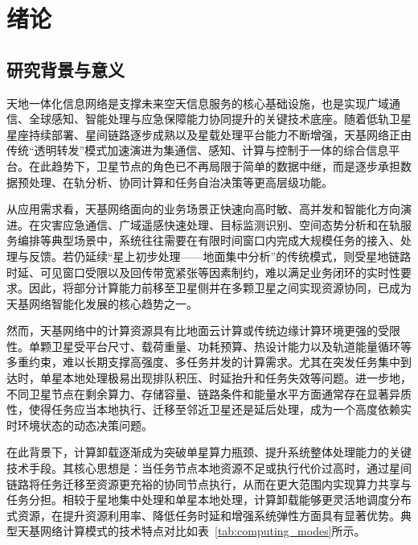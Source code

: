 
\chapter{绪论}
\label{chap:intro}

\section{研究背景与意义}

天地一体化信息网络是支撑未来空天信息服务的核心基础设施，也是实现广域通信、全球感知、智能处理与应急保障能力协同提升的关键技术底座。随着低轨卫星星座持续部署、星间链路逐步成熟以及星载处理平台能力不断增强，天基网络正由传统“透明转发”模式加速演进为集通信、感知、计算与控制于一体的综合信息平台\cite{ref1,ref2,ref3}。在此趋势下，卫星节点的角色已不再局限于简单的数据中继，而是逐步承担数据预处理、在轨分析、协同计算和任务自治决策等更高层级功能。

从应用需求看，天基网络面向的业务场景正快速向高时敏、高并发和智能化方向演进。在灾害应急通信、广域遥感快速处理、目标监测识别、空间态势分析和在轨服务编排等典型场景中，系统往往需要在有限时间窗口内完成大规模任务的接入、处理与反馈。若仍延续“星上初步处理——地面集中分析”的传统模式，则受星地链路时延、可见窗口受限以及回传带宽紧张等因素制约，难以满足业务闭环的实时性要求\cite{ref2,ref4}。因此，将部分计算能力前移至卫星侧并在多颗卫星之间实现资源协同，已成为天基网络智能化发展的核心趋势之一。

然而，天基网络中的计算资源具有比地面云计算或传统边缘计算环境更强的受限性。单颗卫星受平台尺寸、载荷重量、功耗预算、热设计能力以及轨道能量循环等多重约束，难以长期支撑高强度、多任务并发的计算需求。尤其在突发任务集中到达时，单星本地处理极易出现排队积压、时延抬升和任务失效等问题。进一步地，不同卫星节点在剩余算力、存储容量、链路条件和能量水平方面通常存在显著异质性，使得任务应当本地执行、迁移至邻近卫星还是延后处理，成为一个高度依赖实时环境状态的动态决策问题。

在此背景下，计算卸载逐渐成为突破单星算力瓶颈、提升系统整体处理能力的关键技术手段。其核心思想是：当任务节点本地资源不足或执行代价过高时，通过星间链路将任务迁移至资源更充裕的协同节点执行，从而在更大范围内实现算力共享与任务分担\cite{ref1,ref5}。相较于星地集中处理和单星本地处理，计算卸载能够更灵活地调度分布式资源，在提升资源利用率、降低任务时延和增强系统弹性方面具有显著优势。典型天基网络计算模式的技术特点对比如表~\ref{tab:computing_modes}所示。

